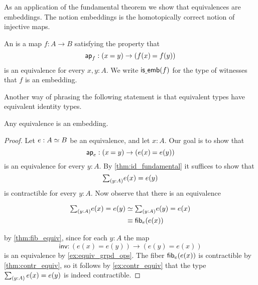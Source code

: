 As an application of the fundamental theorem we show that equivalences are embeddings. The notion embeddings is the homotopically correct notion of injective maps.

\begin{defn}
An  is a map $f:A\to B$ satisfying the property that
\begin{equation*}
\apfunc{f}:(\id{x}{y})\to(\id{f(x)}{f(y)})
\end{equation*}
is an equivalence for every $x,y:A$. We write $\mathsf{is\underline{\ }{}emb}(f)$ for the type of witnesses that $f$ is an embedding.
\end{defn}

Another way of phrasing the following statement is that equivalent types have equivalent identity types.

\begin{thm}
\label{cor:emb_equiv} 
Any equivalence is an embedding.
\end{thm}

\begin{proof}
Let $e:\eqv{A}{B}$ be an equivalence, and let $x:A$. Our goal is to show that
\begin{equation*}
\apfunc{e} : (\id{x}{y})\to (\id{e(x)}{e(y)})
\end{equation*}
is an equivalence for every $y:A$. By \autoref{thm:id_fundamental} it suffices to show that 
\begin{equation*}
\sm{y:A}e(x)=e(y)
\end{equation*}
is contractible for every $y:A$. Now observe that there is an equivalence
\begin{samepage}
\begin{align*}
\sm{y:A}e(x)=e(y) & \eqvsym \sm{y:A}e(y)=e(x) \\
& \jdeq \fib{e}{e(x)}
\end{align*}
\end{samepage}
by \cref{thm:fib_equiv}, since for each $y:A$ the map
\begin{equation*}
\mathsf{inv} : (e(x)=e(y))\to (e(y)= e(x))
\end{equation*}
is an equivalence by \cref{ex:equiv_grpd_ops}.
The fiber $\mathsf{fib}_{e}(e(x))$ is contractible by \cref{thm:contr_equiv}, so it follows by \autoref{ex:contr_equiv} that the type $\sm{y:A}e(x)=e(y)$ is indeed contractible.
\end{proof}

